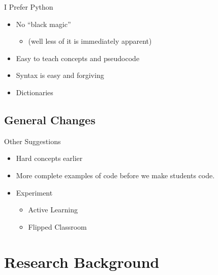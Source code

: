 \documentclass[11pt]{beamer}
\begin{document}
\begin{frame}{I Prefer Python}
	\begin{itemize}
		\item No ``black magic'' 
		\begin{itemize}
			\item (well less of it is immediately apparent)
		\end{itemize}
		\item Easy to teach concepts and pseudocode 
		\item Syntax is easy and forgiving
		\item Dictionaries
	\end{itemize}
\end{frame}



\subsection{General Changes}

\begin{frame}{Other Suggestions}
	\begin{itemize}
	\item Hard concepts earlier
	\item More complete examples of code before we make students code.
	\item Experiment
		\begin{itemize}
			\item Active Learning
			\item Flipped Classroom
		\end{itemize}
	\end{itemize}
		
\end{frame}


\section{Research Background}
\end{document}
